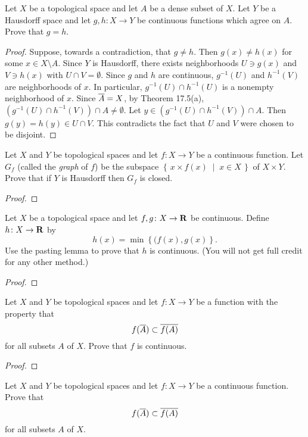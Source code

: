 \begin{problem}
Let $X$ be a topological space and let $A$ be a dense subset of
$X$. Let $Y$ be a Hausdorff space and let $g,h\colon X\to Y$ be
continuous functions which agree on $A$. Prove that $g=h$.
\end{problem}
\begin{proof}
Suppose, towards a contradiction, that $g\neq h$. Then $g(x)\neq
h(x)$ for some $x\in X\setminus A$. Since $Y$ is Hausdorff, there
exists neighborhoods $U\ni g(x)$ and $V\ni h(x)$ with $U\cap
V=\emptyset$. Since $g$ and $h$ are continuous, $g^{-1}(U)$ and
$h^{-1}(V)$ are neighborhoods of $x$. In particular,
$g^{-1}(U)\cap h^{-1}(U)$ is a nonempty neighborhood of
$x$. Since $\overline{A}=X$, by Theorem 17.5(a), $\left(g^{-1}(U)\cap
h^{-1}(V)\right)\cap A\neq\emptyset$. Let $y\in\left(g^{-1}(U)\cap
h^{-1}(V)\right)\cap A$. Then $g(y)=h(y)\in U\cap V$. This
contradicts the fact that $U$ and $V$ were chosen to be
disjoint.
\end{proof}
\begin{problem}
Let $X$ and $Y$ be topological spaces and let $f\colon X\to Y$
be a continuous function. Let $G_f$ (called the \emph{graph} of
$f$) be the subspace $\left\{\,x\times f(x)\;\middle|\;x\in
  X\,\right\}$ of $X\times Y$. Prove that if $Y$ is Hausdorff then
$G_f$ is closed.
\end{problem}
\begin{proof}

\end{proof}
\begin{problem}
Let $X$ be a topological space and let $f,g\colon X\to\mathbf{R}$ be
continuous. Define $h\colon X\to\mathbf{R}$ by
\[
h(x)=\min\left\{(f(x),g(x)\right\}.
\]
Use the pasting lemma to prove that $h$ is continuous. (You will
not get full credit for any other method.)
\end{problem}
\begin{proof}
\end{proof}
\begin{problem}
Let $X$ and $Y$ be topological spaces and let $f\colon X\to Y$ be
a function with the property that
\[
f(\overline{A})\subset\overline{f(A)}
\]
for all subsets $A$ of $X$. Prove that $f$ is continuous.
\end{problem}
\begin{proof}
\end{proof}
\begin{problem}
Let $X$ and $Y$ be topological spaces and let $f\colon X\to Y$ be
a continuous function. Prove that
\[
f(\overline{A})\subset\overline{f(A)}
\]
for all subsets $A$ of $X$.
\end{problem}
